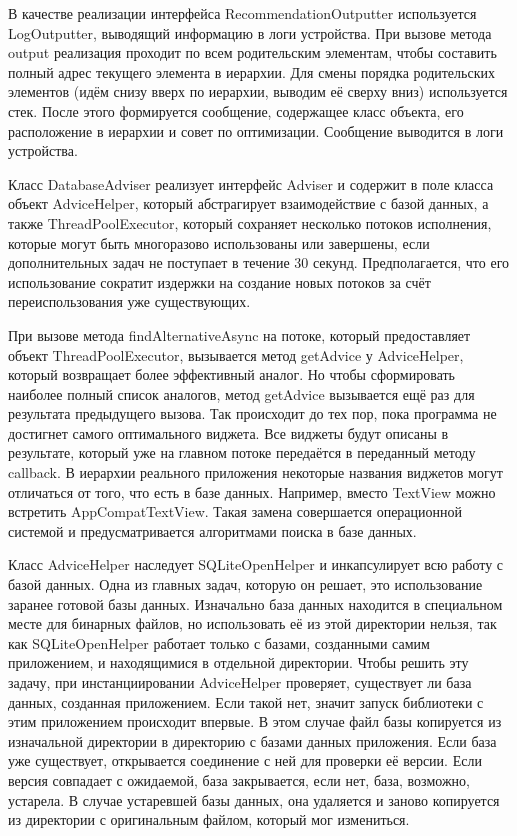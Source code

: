 \documentclass[a4paper,14pt]{extarticle} %
\begin{document}
	В качестве реализации интерфейса RecommendationOutputter используется LogOutputter, выводящий информацию в логи устройства. При вызове метода output реализация проходит по всем родительским элементам, чтобы составить полный адрес текущего элемента в иерархии. Для смены порядка родительских элементов (идём снизу вверх по иерархии, выводим её сверху вниз) используется стек. После этого формируется сообщение, содержащее класс объекта, его расположение в иерархии и совет по оптимизации. Сообщение выводится в логи устройства.
	
	Класс DatabaseAdviser реализует интерфейс Adviser и содержит в поле класса объект AdviceHelper, который абстрагирует взаимодействие с базой данных, а также ThreadPoolExecutor, который сохраняет несколько потоков исполнения, которые могут быть многоразово использованы или завершены, если дополнительных задач не поступает в течение 30 секунд. Предполагается, что его использование сократит издержки на создание новых потоков за счёт переиспользования уже существующих. 
	
	При вызове метода findAlternativeAsync на потоке, который предоставляет объект ThreadPoolExecutor, вызывается метод getAdvice у AdviceHelper, который возвращает более эффективный аналог. Но чтобы сформировать наиболее полный список аналогов, метод getAdvice вызывается ещё раз для результата предыдущего вызова. Так происходит до тех пор, пока программа не достигнет самого оптимального виджета. Все виджеты будут описаны в результате, который уже на главном потоке передаётся в переданный методу callback. В иерархии реального приложения некоторые названия виджетов могут отличаться от того, что есть в базе данных. Например, вместо TextView можно встретить AppCompatTextView. Такая замена совершается операционной системой и предусматривается алгоритмами поиска в базе данных.
	
	Класс AdviceHelper наследует SQLiteOpenHelper и инкапсулирует всю работу с базой данных. Одна из главных задач, которую он решает, это использование заранее готовой базы данных. Изначально база данных находится в специальном месте для бинарных файлов, но использовать её из этой директории нельзя, так как SQLiteOpenHelper работает только с базами, созданными самим приложением, и находящимися в отдельной директории. Чтобы решить эту задачу, при инстанциировании AdviceHelper проверяет, существует ли база данных, созданная приложением. Если такой нет, значит запуск библиотеки с этим приложением происходит впервые. В этом случае файл базы копируется из изначальной директории в директорию с базами данных приложения. Если база уже существует, открывается соединение с ней для проверки её версии. Если версия совпадает с ожидаемой, база закрывается, если нет, база, возможно, устарела. В случае устаревшей базы данных, она удаляется и заново копируется из директории с оригинальным файлом, который мог измениться.
	
\end{document}
